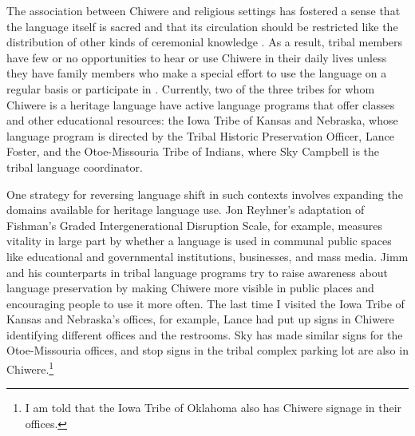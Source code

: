 \documentclass[output=paper]{LSP/langsci}
\begin{document}
The association between Chiwere and religious settings has fostered a sense that the language itself is sacred and that its circulation should be restricted like the distribution of other kinds of ceremonial knowledge \citep{Davidson1997}. As a result, tribal members have few or no opportunities to hear or use Chiwere in their daily lives unless they have family members who make a special effort to use the language on a regular basis or participate in . Currently, two of the three tribes for whom Chiwere is a heritage language have active language programs that offer classes and other educational resources: the Iowa Tribe of Kansas and Nebraska, whose language program is directed by the Tribal Historic Preservation Officer, Lance Foster, and the Otoe-Missouria Tribe of Indians, where Sky Campbell is the tribal language coordinator.

One strategy for reversing language shift in such contexts involves expanding the domains available for heritage language use. Jon Reyhner's \citeyearpar[vii]{Reyhner1999} adaptation of Fishman's \citeyearpar{Fishman1991} Graded Intergenerational Disruption Scale, for example, measures vitality in large part by whether a language is used in communal public spaces like educational and governmental institutions, businesses, and mass media. Jimm and his counterparts in tribal language programs try to raise awareness about language preservation by making Chiwere more visible in public places and encouraging people to use it more often. The last time I visited the Iowa Tribe of Kansas and Nebraska's offices, for example, Lance had put up signs in Chiwere identifying different offices and the restrooms. Sky has made similar signs for the Otoe-Missouria offices, and stop signs in the tribal complex parking lot are also in Chiwere.\footnote{I am told that the Iowa Tribe of Oklahoma also has Chiwere signage in their offices.}
\end{document}
